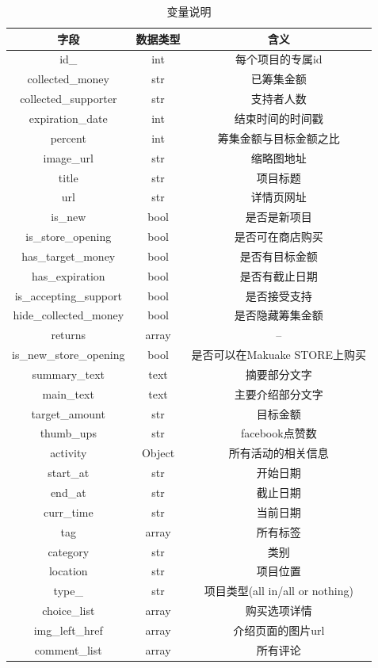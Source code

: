 \documentclass[lang=cn,a4paper]{elegantpaper}
\begin{document}
\begin{table}
\centering
\caption{变量说明}
\begin{tabular}{ccc}
\toprule
字段&数据类型&含义\\
\midrule
id\_ &int &      每个项目的专属id       \\
 collected\_money  &str &         已筹集金额          \\
collected\_supporter&str &       支持者人数          \\
 expiration\_date  &int &      结束时间的时间戳       \\
     percent      &int &   筹集金额与目标金额之比    \\
    image\_url     &str &         缩略图地址          \\
      title       &str &          项目标题           \\
       url        &str &         详情页网址          \\
      is\_new      &bool&        是否是新项目         \\
 is\_store\_opening &bool&      是否可在商店购买       \\
 has\_target\_money &bool&       是否有目标金额        \\
  has\_expiration  &bool&       是否有截止日期        \\
is\_accepting\_support &bool&     是否接受支持         \\
hide\_collected\_money &bool&    是否隐藏筹集金额       \\
  returns      & array&             --              \\
is\_new\_store\_opening& bool&是否可以在Makuake STORE上购买\\
   summary\_text   &text&        摘要部分文字         \\
    main\_text     &text&      主要介绍部分文字       \\
  target\_amount   &str &          目标金额           \\
    thumb\_ups     &str &       facebook点赞数        \\
   activity   & Object&      所有活动的相关信息      \\
     start\_at     &str &          开始日期           \\
      end\_at      &str &          截止日期           \\
    curr\_time     &str &          当前日期           \\
      tag        & array&          所有标签           \\
     category     &str &            类别             \\
     location     &str &          项目位置           \\
  type\_       &str & 项目类型(all in/all or nothing) \\
   choice\_list  & array&        购买选项详情         \\
  img\_left\_href  & array&    介绍页面的图片url      \\
   comment\_list  & array&          所有评论           \\
\bottomrule
\end{tabular}
\label{tbl:变量说明}


\end{table}
\end{document}
